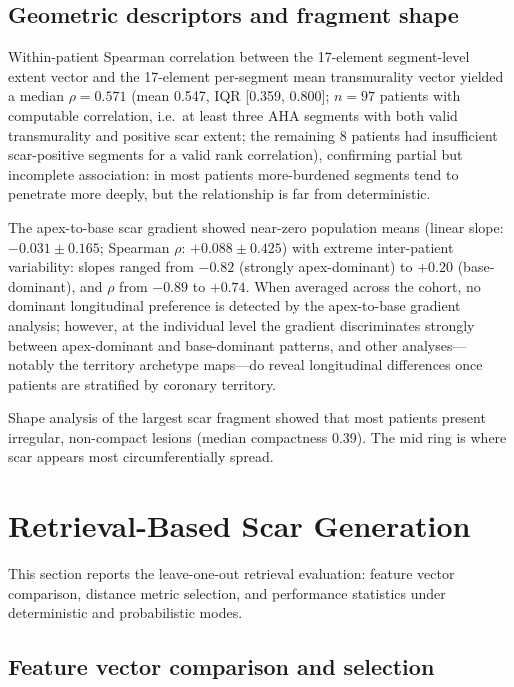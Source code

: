 \vspace{-0.8em}
\subsection{Geometric descriptors and fragment shape}

Within-patient Spearman correlation between the 17-element segment-level extent vector
and the 17-element per-segment mean transmurality vector yielded a median $\rho = 0.571$
(mean 0.547, IQR [0.359, 0.800]; $n = 97$ patients with computable correlation, i.e.\ at
least three AHA segments with both valid transmurality and positive scar extent; the
remaining 8 patients had insufficient scar-positive segments for a valid rank correlation),
confirming partial but incomplete association: in most patients more-burdened segments
tend to penetrate more deeply, but the relationship is far from deterministic.

The apex-to-base scar gradient showed near-zero population means (linear slope:
$-0.031 \pm 0.165$; Spearman $\rho$: $+0.088 \pm 0.425$) with extreme inter-patient
variability: slopes ranged from $-0.82$ (strongly apex-dominant) to $+0.20$ (base-dominant),
and $\rho$ from $-0.89$ to $+0.74$. When averaged across the cohort, no dominant
longitudinal preference is detected by the apex-to-base gradient analysis; however, at the
individual level the gradient discriminates strongly between apex-dominant and base-dominant
patterns, and other analyses---notably the territory archetype maps---do reveal longitudinal
differences once patients are stratified by coronary territory.

Shape analysis of the largest scar fragment showed that most patients present irregular,
non-compact lesions (median compactness 0.39). The mid ring is where scar appears most
circumferentially spread.

\FloatBarrier
\section{Retrieval-Based Scar Generation}

This section reports the leave-one-out retrieval evaluation: feature vector comparison,
distance metric selection, and performance statistics under deterministic and probabilistic
modes.

\subsection{Feature vector comparison and selection}

